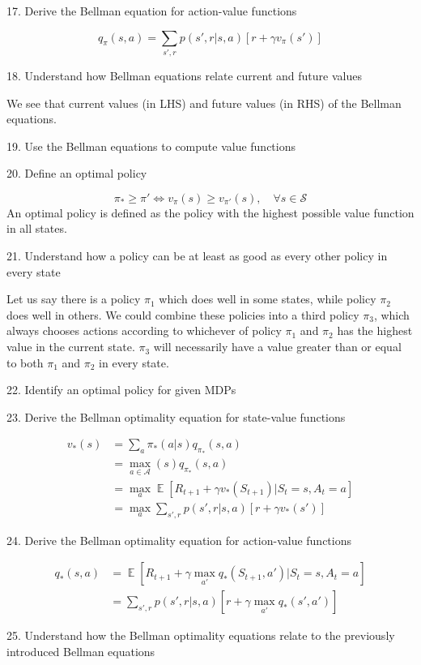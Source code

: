 \documentclass[lang=en,mode=geye,device=normal,color=blue,14pt]{elegantnote}
\DeclareMathOperator*{\E}{\mathbb{E}}
\DeclareMathOperator*{\1}{\mathbbm{1}}
\begin{document}
17. Derive the Bellman equation for action-value functions

$$ q_\pi(s,a) = \sum_{s', r} p(s',r|s,a) [r+\gamma v_\pi(s')] $$

18. Understand how Bellman equations relate current and future values

We see that current values (in LHS) and future values (in RHS) of the Bellman equations.

19. Use the Bellman equations to compute value functions

20. Define an optimal policy

$$ \pi_* \geq \pi' \iff v_\pi(s) \geq v_{\pi'}(s), \quad \forall s \in \mathcal{S} $$
An optimal policy is defined as the policy with the highest possible value function in all states.

21. Understand how a policy can be at least as good as every other policy in every state

Let us say there is a policy $\pi_1$ which does well in some states, while policy $\pi_2$ does well in others. We could combine these policies into a third policy $\pi_3$, which always chooses actions according to whichever of policy $\pi_1$ and $\pi_2$ has the highest value in the current state. $\pi_3$ will necessarily have a value greater than or equal to both $\pi_1$ and $\pi_2$ in every state.

22. Identify an optimal policy for given MDPs

23. Derive the Bellman optimality equation for state-value functions

\begin{align*}
v_*(s) &= \sum_a \pi_* (a|s) q_{\pi_*} (s,a) \\
& = \max_{a\in\mathcal{A}}(s) q_{\pi_*} (s,a) \\
& = \max_a \E [R_{t+1} + \gamma v_* (S_{t+1}) | S_t = s, A_t = a] \\
& = \max_a \sum_{s',r} p(s',r|s,a)[r+\gamma v_*(s')]
\end{align*}

24. Derive the Bellman optimality equation for action-value functions

\begin{align*}
q_*(s,a) & = \E [R_{t+1} + \gamma \max_{a'} q_*(S_{t+1}, a') | S_t = s, A_t = a] \\
& = \sum_{s',r} p(s',r|s,a)[r+\gamma \max_{a'} q_*(s',a')]
\end{align*}

25. Understand how the Bellman optimality equations relate to the previously introduced Bellman equations
\end{document}
